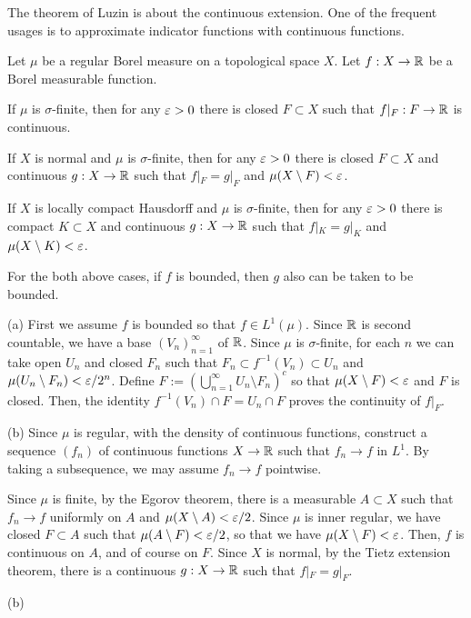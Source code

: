 \documentclass{../note}
\begin{document}
\begin{prb}
The theorem of Luzin is about the continuous extension.
One of the frequent usages is to approximate indicator functions with continuous functions.

Let $\mu$ be a regular Borel measure on a topological space $X$.
Let $f:X\to\mathbb{R}$ be a Borel measurable function.
\begin{parts}
\item If $\mu$ is $\sigma$-finite, then for any $\varepsilon>0$ there is closed $F\subset X$ such that $f|_F:F\to\mathbb{R}$ is continuous.
\item If $X$ is normal and $\mu$ is $\sigma$-finite, then for any $\varepsilon>0$ there is closed $F\subset X$ and continuous $g:X\to\mathbb{R}$ such that $f|_F=g|_F$ and $\mu(X\setminus F)<\varepsilon$.
\item If $X$ is locally compact Hausdorff and $\mu$ is $\sigma$-finite, then for any $\varepsilon>0$ there is compact $K\subset X$ and continuous $g:X\to\mathbb{R}$ such that $f|_K=g|_K$ and $\mu(X\setminus K)<\varepsilon$.
\item For the both above cases, if $f$ is bounded, then $g$ also can be taken to be bounded.
\end{parts}
\end{prb}
\begin{pf}
(a)
First we assume $f$ is bounded so that $f\in L^1(\mu)$.
Since $\mathbb{R}$ is second countable, we have a base $(V_n)_{n=1}^\infty$ of $\mathbb{R}$.
Since $\mu$ is $\sigma$-finite, for each $n$ we can take open $U_n$ and closed $F_n$ such that $F_n\subset f^{-1}(V_n)\subset U_n$ and $\mu(U_n\setminus F_n)<\varepsilon/2^n$.
Define $F:=\left(\bigcup_{n=1}^\infty U_n\setminus F_n\right)^c$ so that $\mu(X\setminus F)<\varepsilon$ and $F$ is closed.
Then, the identity $f^{-1}(V_n)\cap F=U_n\cap F$ proves the continuity of $f|_F$.

(b)
Since $\mu$ is regular, with the density of continuous functions, construct a sequence $(f_n)$ of continuous functions $X\to\mathbb{R}$ such that $f_n\to f$ in $L^1$.
By taking a subsequence, we may assume $f_n\to f$ pointwise.

Since $\mu$ is finite, by the Egorov theorem, there is a measurable $A\subset X$ such that $f_n\to f$ uniformly on $A$ and $\mu(X\setminus A)<\varepsilon/2$.
Since $\mu$ is inner regular, we have closed $F\subset A$ such that $\mu(A\setminus F)<\varepsilon/2$, so that we have $\mu(X\setminus F)<\varepsilon$.
Then, $f$ is continuous on $A$, and of course on $F$.
Since $X$ is normal, by the Tietz extension theorem, there is a continuous $g:X\to\mathbb{R}$ such that $f|_F=g|_F$.

(b)

\end{pf}
\end{document}

